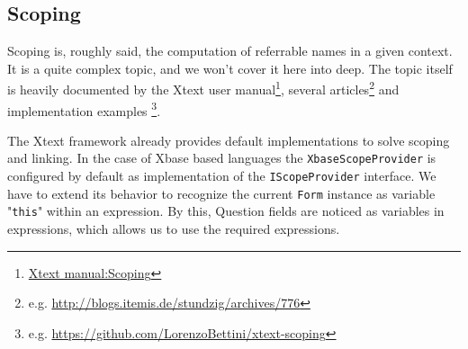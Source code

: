 \subsection{Scoping} \label{sec:scoping}

Scoping is, roughly said, the computation of referrable names in a given
context. It is a quite complex topic, and we won't cover it here into deep.
The topic itself is heavily documented by the Xtext user
manual\footnote{\href{http://www.eclipse.org/Xtext/documentation.html\#scoping}{Xtext
manual:Scoping}}, several articles\footnote{e.g.
\url{http://blogs.itemis.de/stundzig/archives/776}} and implementation examples
\footnote{e.g. \url{https://github.com/LorenzoBettini/xtext-scoping}}.

The Xtext framework already provides default implementations to solve scoping
and linking. In the case of Xbase based languages the
\texttt{XbaseScopeProvider} is configured by default as implementation of the
\texttt{IScopeProvider} interface. We have to extend its behavior to recognize
the current \texttt{Form} instance as variable "\texttt{this}" within an
expression. By this, Question fields are noticed as variables in expressions,
which allows us to use the required expressions.

